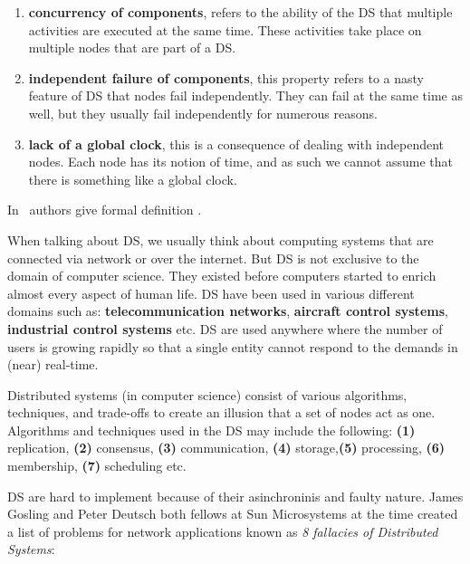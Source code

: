 \begin{enumerate}[start=1,label={(\bfseries \arabic*)}]
	\item \textbf{concurrency of components}, refers to the ability of the DS that multiple activities are executed at the same time. These activities take place on multiple nodes that are part of a DS.
	\item \textbf{independent failure of components}, this property refers to a nasty feature of DS that nodes fail independently. They can fail at the same time as well, but they usually fail independently for numerous reasons.
	\item \textbf{lack of a global clock}, this is a consequence of dealing with independent nodes. Each node has its notion of time, and as such we cannot assume that there is something like a global clock.
\end{enumerate} 

\noindent
In~\cite{SteenT16} authors give formal definition .

When talking about DS, we usually think about computing systems that are connected via network or over the internet. But DS is not exclusive to the domain of computer science. They existed before computers started to enrich almost every aspect of human life. DS have been used in various different domains such as: \textbf{telecommunication networks}, \textbf{aircraft control systems}, \textbf{industrial control systems} etc. DS are used anywhere where the number of users is growing rapidly so that a single entity cannot respond to the demands in (near) real-time.

Distributed systems (in computer science) consist of various algorithms, techniques, and trade-offs to create an illusion that a set of nodes act as one. Algorithms and techniques used in the DS may include the following: \textbf{(1)} replication, \textbf{(2)} consensus, \textbf{(3)} communication, \textbf{(4)} storage,\textbf{(5)} processing, \textbf{(6)} membership, \textbf{(7)} scheduling etc.

DS are hard to implement because of their asinchroninis and faulty nature. James Gosling and Peter Deutsch both fellows at Sun Microsystems at the time created a list of problems for network applications known as \textit{8 fallacies of Distributed Systems}:\label{enum:fallacies}

